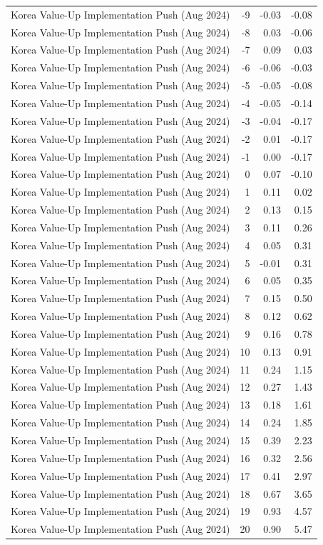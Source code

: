\begin{table}
\begin{tabular}{lrrr}
Korea Value-Up Implementation Push (Aug 2024) & -9 & -0.03 & -0.08 \\
Korea Value-Up Implementation Push (Aug 2024) & -8 & 0.03 & -0.06 \\
Korea Value-Up Implementation Push (Aug 2024) & -7 & 0.09 & 0.03 \\
Korea Value-Up Implementation Push (Aug 2024) & -6 & -0.06 & -0.03 \\
Korea Value-Up Implementation Push (Aug 2024) & -5 & -0.05 & -0.08 \\
Korea Value-Up Implementation Push (Aug 2024) & -4 & -0.05 & -0.14 \\
Korea Value-Up Implementation Push (Aug 2024) & -3 & -0.04 & -0.17 \\
Korea Value-Up Implementation Push (Aug 2024) & -2 & 0.01 & -0.17 \\
Korea Value-Up Implementation Push (Aug 2024) & -1 & 0.00 & -0.17 \\
Korea Value-Up Implementation Push (Aug 2024) & 0 & 0.07 & -0.10 \\
Korea Value-Up Implementation Push (Aug 2024) & 1 & 0.11 & 0.02 \\
Korea Value-Up Implementation Push (Aug 2024) & 2 & 0.13 & 0.15 \\
Korea Value-Up Implementation Push (Aug 2024) & 3 & 0.11 & 0.26 \\
Korea Value-Up Implementation Push (Aug 2024) & 4 & 0.05 & 0.31 \\
Korea Value-Up Implementation Push (Aug 2024) & 5 & -0.01 & 0.31 \\
Korea Value-Up Implementation Push (Aug 2024) & 6 & 0.05 & 0.35 \\
Korea Value-Up Implementation Push (Aug 2024) & 7 & 0.15 & 0.50 \\
Korea Value-Up Implementation Push (Aug 2024) & 8 & 0.12 & 0.62 \\
Korea Value-Up Implementation Push (Aug 2024) & 9 & 0.16 & 0.78 \\
Korea Value-Up Implementation Push (Aug 2024) & 10 & 0.13 & 0.91 \\
Korea Value-Up Implementation Push (Aug 2024) & 11 & 0.24 & 1.15 \\
Korea Value-Up Implementation Push (Aug 2024) & 12 & 0.27 & 1.43 \\
Korea Value-Up Implementation Push (Aug 2024) & 13 & 0.18 & 1.61 \\
Korea Value-Up Implementation Push (Aug 2024) & 14 & 0.24 & 1.85 \\
Korea Value-Up Implementation Push (Aug 2024) & 15 & 0.39 & 2.23 \\
Korea Value-Up Implementation Push (Aug 2024) & 16 & 0.32 & 2.56 \\
Korea Value-Up Implementation Push (Aug 2024) & 17 & 0.41 & 2.97 \\
Korea Value-Up Implementation Push (Aug 2024) & 18 & 0.67 & 3.65 \\
Korea Value-Up Implementation Push (Aug 2024) & 19 & 0.93 & 4.57 \\
Korea Value-Up Implementation Push (Aug 2024) & 20 & 0.90 & 5.47 \\
\bottomrule
\end{tabular}
\end{table}
